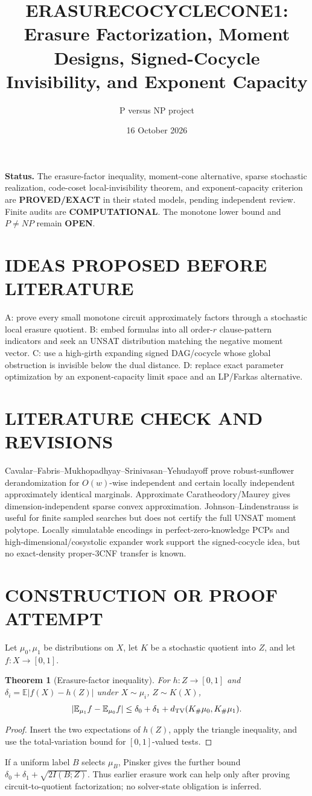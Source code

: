 \documentclass[11pt]{article}
\title{ERASURECOCYCLECONE1: Erasure Factorization, Moment Designs, Signed-Cocycle Invisibility, and Exponent Capacity}
\author{P versus NP project}
\date{16 October 2026}
\newtheorem{theorem}{Theorem}
\begin{document}
\maketitle
\noindent\textbf{Status.} The erasure-factor inequality, moment-cone alternative, sparse stochastic realization, code-coset local-invisibility theorem, and exponent-capacity criterion are \textbf{PROVED/EXACT} in their stated models, pending independent review. Finite audits are \textbf{COMPUTATIONAL}. The monotone lower bound and $P\ne NP$ remain \textbf{OPEN}.

\section{IDEAS PROPOSED BEFORE LITERATURE}
A: prove every small monotone circuit approximately factors through a stochastic local erasure quotient. B: embed formulas into all order-$r$ clause-pattern indicators and seek an UNSAT distribution matching the negative moment vector. C: use a high-girth expanding signed DAG/cocycle whose global obstruction is invisible below the dual distance. D: replace exact parameter optimization by an exponent-capacity limit space and an LP/Farkas alternative.

\section{LITERATURE CHECK AND REVISIONS}
Cavalar--Fabris--Mukhopadhyay--Srinivasan--Yehudayoff prove robust-sunflower derandomization for $O(w)$-wise independent and certain locally independent approximately identical marginals. Approximate Caratheodory/Maurey gives dimension-independent sparse convex approximation. Johnson--Lindenstrauss is useful for finite sampled searches but does not certify the full UNSAT moment polytope. Locally simulatable encodings in perfect-zero-knowledge PCPs and high-dimensional/cosystolic expander work support the signed-cocycle idea, but no exact-density proper-3CNF transfer is known.

\section{CONSTRUCTION OR PROOF ATTEMPT}
Let $\mu_0,\mu_1$ be distributions on $X$, let $K$ be a stochastic quotient into $Z$, and let $f:X\to[0,1]$.
\begin{theorem}[Erasure-factor inequality]
For $h:Z\to[0,1]$ and $\delta_i=\mathbb E|f(X)-h(Z)|$ under $X\sim\mu_i$, $Z\sim K(X)$,
\[
|\mathbb E_{\mu_1}f-\mathbb E_{\mu_0}f|
\le \delta_0+\delta_1+d_{\rm TV}(K_\#\mu_0,K_\#\mu_1).
\]
\end{theorem}
\begin{proof}Insert the two expectations of $h(Z)$, apply the triangle inequality, and use the total-variation bound for $[0,1]$-valued tests.\end{proof}
If a uniform label $B$ selects $\mu_B$, Pinsker gives the further bound $\delta_0+\delta_1+\sqrt{2I(B;Z)}$. Thus earlier erasure work can help only after proving circuit-to-quotient factorization; no solver-state obligation is inferred.
\end{document}
